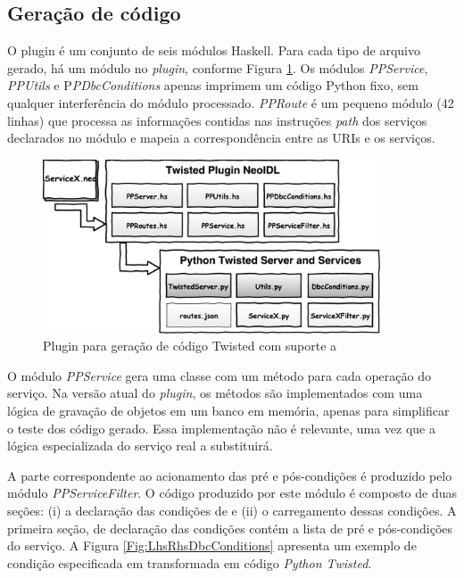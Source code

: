 \subsection{Geração de código}

O plugin \twisted{} é um conjunto de seis módulos Haskell. Para cada tipo de
arquivo gerado, há um módulo no \textit{plugin}, conforme Figura
\ref{PluginTwisted}.
Os módulos \emph{PPService}, \emph{PPUtils} e P\emph{PDbcConditions} apenas
imprimem um código Python fixo, sem qualquer interferência do módulo \neoidl{}
processado. \emph{PPRoute} é um pequeno módulo (42 linhas) que processa as
informações contidas nas instruções \emph{path} dos serviços declarados no
módulo \neoidl{} e mapeia a correspondência entre as URIs e os serviços.

\begin{figure}[!htb]
\centering
\includegraphics[width=100mm,trim = 0mm 0mm 0mm 
0mm,clip]{img/PluginTwisted.pdf}
\caption{Plugin para geração de código Twisted com suporte a \designbycontract{}}
\label{PluginTwisted}
\end{figure}

O módulo \emph{PPService} gera uma classe com um método para cada operação do
serviço. Na versão atual do \textit{plugin}, os métodos são implementados com
uma lógica de gravação de objetos em um banco em memória, apenas para simplificar o teste
dos código gerado. Essa implementação não é relevante, uma vez que a lógica
especializada do serviço real a substituirá.

A parte correspondente ao acionamento das pré e pós-condições é produzido pelo
módulo \emph{PPServiceFilter}. O código produzido por este módulo é composto de
duas seções: (i) a declaração das condições de \designbycontract{} e (ii) o
carregamento dessas condições. A primeira seção, de declaração das condições
\designbycontract{} contém a lista de pré e pós-condições do serviço. A Figura 
\ref{Fig:LhsRhsDbcConditions} apresenta um exemplo de condição especificada em
\neoidl{} transformada em código \emph{Python Twisted}.

